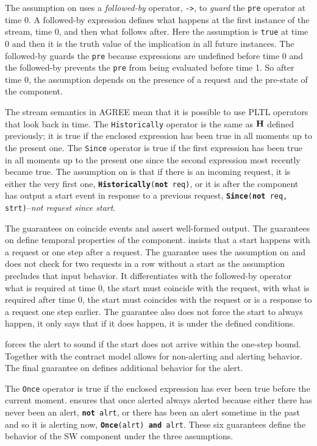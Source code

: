 The assumption on  uses a \emph{followed-by} operator, \texttt{->}, to \emph{guard} the \texttt{pre} operator at time 0.
A followed-by expression defines what happens at the first instance of the stream, time 0, and then what follows after. 
Here the assumption is \texttt{true} at time 0 and then it is the truth value of the implication in all future instances.
The followed-by guards the \texttt{pre} because expressions are undefined before time 0 and the followed-by prevents the \texttt{pre} from being evaluated before time 1.
So after time 0, the assumption depends on the presence of a request and the pre-state of the component.

The stream semantics in AGREE mean that it is possible to use PLTL operators that look back in time.
The \texttt{Historically} operator is the same as $\mathbf{H}$ defined previously; it is true if the enclosed expression has been true in all moments up to the present one. 
The \texttt{Since} operator is true if the first expression has been true in all moments up to the present one since the second expression most recently became true.
The assumption on  is that if there is an incoming request, it is either the very first one, \texttt{\textbf{Historically}(\textbf{not} req)}, or it is after the component has output a start event in response to a previous request, \texttt{\textbf{Since}(\textbf{not} req, strt)}--\emph{not request since start}.

The guarantees on  coincide events and assert well-formed output.
The guarantees on  define temporal properties of the component.
 insists that a start happens with a request or one step after a request.
The guarantee uses the assumption on  and does not check for two requests in a row without a start as the assumption precludes that input behavior.
It differentiates with the followed-by operator what is required at time 0, the start must coincide with the request, with what is required after time 0, the start must coincides with the request or is a response to a request one step earlier.
The guarantee also does not force the start to always happen, it only says that if it does happen, it is under the defined conditions.

 forces the alert to sound if the start does not arrive within the one-step bound.
Together with  the contract model allows for non-alerting and alerting behavior.
The final guarantee on  defines additional behavior for the alert.

The \texttt{Once} operator is true if the enclosed expression has ever been true before the current moment.
 ensures that once alerted always alerted because either there has never been an alert, \texttt{\textbf{not} alrt}, or there has been an alert sometime in the past and so it is alerting now, \texttt{\textbf{Once}(alrt) \textbf{and} alrt}.
These six guarantees define the behavior of the SW component under the three assumptions.
